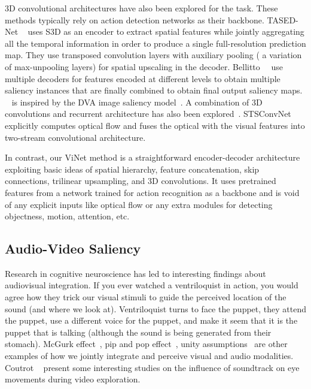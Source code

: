\documentclass[letterpaper, 10 pt, conference]{ieeeconf}  \usepackage{times}
\begin{document}
3D convolutional architectures have also been explored for the task. These methods typically rely on action detection networks as their backbone. TASED-Net ~\cite{min2019tased} uses S3D as an encoder to extract spatial features while jointly aggregating all the temporal information in order to produce a single full-resolution prediction map. They use transposed convolution layers with auxiliary pooling ( a variation of max-unpooling layers) for spatial upscaling in the decoder. Bellitto~\etal~\cite{bellitto2020video} use multiple decoders for features encoded at different levels to obtain multiple saliency instances that are finally combined to obtain final output saliency maps. ~\cite{bellitto2020video} is inspired by the DVA image saliency model~\cite{wang2017deep}. A combination of 3D convolutions and recurrent architecture has also been explored~\cite{bazzani2016recurrent}. STSConvNet~\cite{bak2017spatio} explicitly computes optical flow and fuses the optical with the visual features into two-stream convolutional architecture. 


In contrast, our ViNet method is a straightforward encoder-decoder architecture exploiting basic ideas of spatial hierarchy, feature concatenation, skip connections, trilinear upsampling, and 3D convolutions. It uses pretrained features from a network trained for action recognition as a backbone and is void of any explicit inputs like optical flow or any extra modules for detecting objectness, motion, attention, etc. 











\subsection{Audio-Video Saliency}

Research in cognitive neuroscience has led to interesting findings about audiovisual integration. If you ever watched a ventriloquist in action, you would agree how they trick our visual stimuli to guide the perceived location of the sound (and where we look at). Ventriloquist turns to face the puppet, they attend the puppet, use a different voice for the puppet, and make it seem that it is the puppet that is talking (although the sound is being generated from their stomach). McGurk effect~\cite{mcgurk1976hearing}, pip and pop effect~\cite{van2008pip}, unity assumptions~\cite{vatakis2007crossmodal} are other examples of how we jointly integrate and perceive visual and audio modalities. Coutrot \etal~\cite{coutrot2012influence, coutrot2014saliency, coutrot2016multimodal} present some interesting studies on the influence of soundtrack on eye movements during video exploration.  
\end{document}
